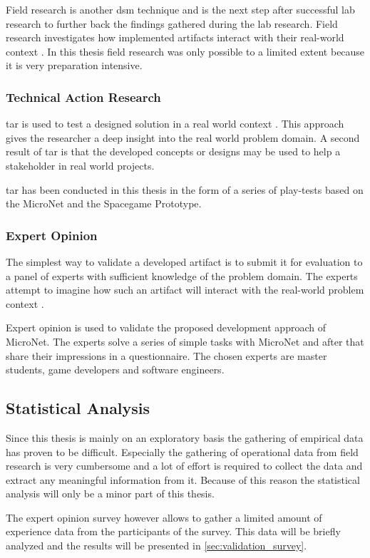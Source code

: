 Field research is another \gls{dsm} technique and is the next step after
successful lab research to further back the findings gathered during the lab
research. Field research investigates how implemented artifacts interact with
their real-world context \cite{wieringa2014design_science}. In this thesis field
research was only possible to a limited extent because it is very preparation
intensive.

\subsubsection{Technical Action Research}

\gls{tar} is used to test a designed solution in a real world context
\cite{wieringa2014design_science}. This approach gives the researcher a deep
insight into the real world problem domain. A second result of \gls{tar} is that
the developed concepts or designs may be used to help a stakeholder in real
world projects.

\gls{tar} has been conducted in this thesis in the form of a series of
play-tests based on the MicroNet and the Spacegame Prototype.

\subsubsection{Expert Opinion}

The simplest way to validate a developed artifact is to submit it for evaluation
to a panel of experts with sufficient knowledge of the problem domain. The
experts attempt to imagine how such an artifact will interact with the
real-world problem context \cite{wieringa2014design_science}.

Expert opinion is used to validate the proposed development approach of
MicroNet. The experts solve a series of simple tasks with MicroNet and after
that share their impressions in a questionnaire. The chosen experts are master
students, game developers and software engineers.

\subsection{Statistical Analysis}

Since this thesis is mainly on an exploratory basis the gathering of empirical
data has proven to be difficult. Especially the gathering of operational data from
field research is very cumbersome and a lot of effort is required to collect
the data and extract any meaningful information from it. Because of this
reason the statistical analysis will only be a minor part of this thesis.

The expert opinion survey however allows to gather a limited amount of
experience data from the participants of the survey. This data will be briefly
analyzed and the results will be presented in \autoref{sec:validation_survey}.






